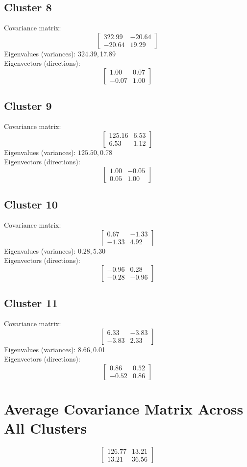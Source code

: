 \documentclass{article}
\begin{document}
\subsection*{Cluster 8}
Covariance matrix:
\[\begin{bmatrix}322.99 & -20.64 \\-20.64 & 19.29\end{bmatrix}\]
Eigenvalues (variances): $ 324.39, $17.89\\
Eigenvectors (directions):
\[\begin{bmatrix}1.00 & 0.07 \\-0.07 & 1.00\end{bmatrix}\]
\subsection*{Cluster 9}
Covariance matrix:
\[\begin{bmatrix}125.16 & 6.53 \\6.53 & 1.12\end{bmatrix}\]
Eigenvalues (variances): $ 125.50, $0.78\\
Eigenvectors (directions):
\[\begin{bmatrix}1.00 & -0.05 \\0.05 & 1.00\end{bmatrix}\]
\subsection*{Cluster 10}
Covariance matrix:
\[\begin{bmatrix}0.67 & -1.33 \\-1.33 & 4.92\end{bmatrix}\]
Eigenvalues (variances): $ 0.28, $5.30\\
Eigenvectors (directions):
\[\begin{bmatrix}-0.96 & 0.28 \\-0.28 & -0.96\end{bmatrix}\]
\subsection*{Cluster 11}
Covariance matrix:
\[\begin{bmatrix}6.33 & -3.83 \\-3.83 & 2.33\end{bmatrix}\]
Eigenvalues (variances): $ 8.66, $0.01\\
Eigenvectors (directions):
\[\begin{bmatrix}0.86 & 0.52 \\-0.52 & 0.86\end{bmatrix}\]
\section*{Average Covariance Matrix Across All Clusters}
\[\begin{bmatrix}126.77 & 13.21 \\13.21 & 36.56\end{bmatrix}\]
\end{document}
